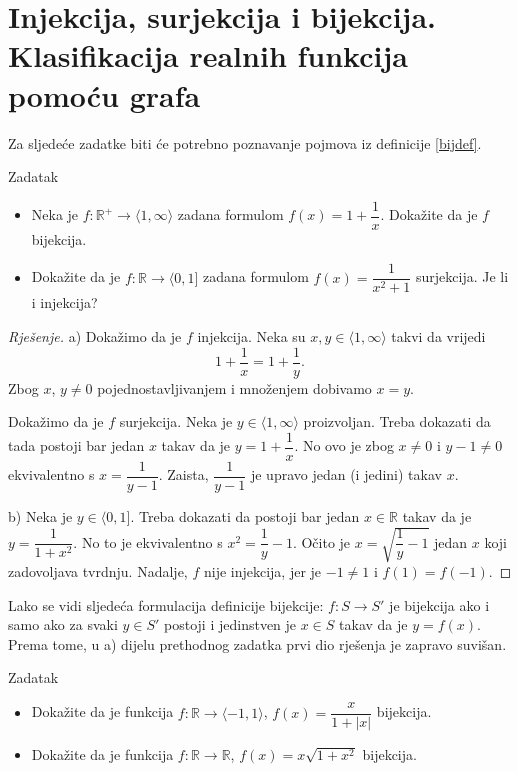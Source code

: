 \section{Injekcija, surjekcija i bijekcija. Klasifikacija realnih funkcija pomoću grafa}
Za sljedeće zadatke biti će potrebno poznavanje pojmova iz definicije \ref{bijdef}.
\begin{exercise}{Zadatak} \textbf{}
\begin{itemize}
\item[a)] Neka je \(f : \mathbb{R}^+\to \langle 1, \infty\rangle \) zadana formulom \(f(x)=1+\dfrac{1}{x}\). Dokažite da je \(f\) bijekcija.
\item[b)] Dokažite da je \(f : \mathbb{R}\to \langle 0, 1]\) zadana formulom \(f(x)=\dfrac{1}{x^2+1}\) surjekcija. Je li i injekcija?
\end{itemize}
\end{exercise}
\begin{proof}[Rješenje]
a) Dokažimo da je \(f\) injekcija. Neka su \(x, y\in \langle 1, \infty\rangle\) takvi da vrijedi \[1+\dfrac{1}{x}=1+\dfrac{1}{y}.\] Zbog \(x\), \(y\neq 0\) pojednostavljivanjem i množenjem dobivamo \(x=y\). 

Dokažimo da je \(f\) surjekcija. Neka je \(y\in \langle 1, \infty\rangle\) proizvoljan. Treba dokazati da tada postoji bar jedan \(x\) takav da je \(y=1+\dfrac{1}{x}\). No ovo je zbog \(x\neq 0\) i \(y-1\neq 0\) ekvivalentno s \(x=\dfrac{1}{y-1}\). Zaista, \(\dfrac{1}{y-1}\) je upravo jedan (i jedini) takav \(x\).

b) Neka je \(y\in \langle 0, 1]\). Treba dokazati da postoji bar jedan \(x\in \mathbb{R}\) takav da je \(y=\dfrac{1}{1+x^2}\). No to je ekvivalentno s \(x^2=\dfrac{1}{y}-1\). Očito je \(x=\sqrt{\dfrac{1}{y}-1}\) jedan \(x\) koji zadovoljava tvrdnju. Nadalje, \(f\) nije injekcija, jer je \(-1\neq 1\) i \(f(1)=f(-1)\).
\end{proof}
\begin{remark}
\label{altbij}
Lako se vidi sljedeća formulacija definicije bijekcije: \(f : S\to S'\) je bijekcija ako i samo ako za svaki \(y\in S'\) postoji i jedinstven je \(x\in S\) takav da je \(y=f(x)\). Prema tome, u a) dijelu prethodnog zadatka prvi dio rješenja je zapravo suvišan.
\end{remark}
\begin{exercise}{Zadatak} \textbf{}
\begin{itemize}
\item[a)] Dokažite da je funkcija \(f : \mathbb{R} \to \langle -1, 1\rangle\), \(f(x)=\dfrac{x}{1+|x|}\) bijekcija.
\item[b)] Dokažite da je funkcija \(f : \mathbb{R} \to \mathbb{R}\), \(f(x)=x\sqrt{1+x^2}\) bijekcija.
\end{itemize}
\end{exercise}
